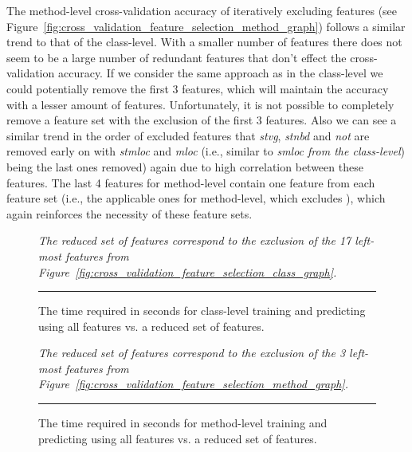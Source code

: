 The method-level cross-validation accuracy of iteratively excluding features (see Figure~\ref{fig:cross_validation_feature_selection_method_graph}) follows a similar trend to that of the class-level. With a smaller number of features there does not seem to be a large number of redundant features that don't effect the cross-validation accuracy. If we consider the same approach as in the class-level we could potentially remove the first 3 features, which will maintain the accuracy with a lesser amount of features. Unfortunately, it is not possible to completely remove a feature set with the exclusion of the first 3 features. Also we can see a similar trend in the order of excluded features that \emph{stvg}, \emph{stnbd} and \emph{not} are removed early on with \emph{stmloc} and \emph{mloc} (i.e., similar to \emph{smloc from the class-level}) being the last ones removed) again due to high correlation between these features. The last 4 features for method-level contain one feature from each feature set (i.e., the applicable ones for method-level, which excludes ), which again reinforces the necessity of these feature sets.

\begin{figure}[ht!]
  \centering
  \begin{adjustbox}{max size={.95\textwidth}{.95\textheight}}
    
  \end{adjustbox}
  \caption{The time required in seconds for class-level training and predicting using all features vs. a reduced set of features.}  \vspace{1mm}
  \footnotesize{\emph{The reduced set of features correspond to the exclusion of the 17 left-most features from Figure~\ref{fig:cross_validation_feature_selection_class_graph}.}}
  \vspace{2mm}
  \hrule
  \label{fig:class_train_prediction_default_time_graph}
\end{figure}

\begin{figure}[ht!]
  \centering
  \begin{adjustbox}{max size={.95\textwidth}{.95\textheight}}
    
  \end{adjustbox}
  \caption{The time required in seconds for method-level training and predicting using all features vs. a reduced set of features.}
  \vspace{1mm}
  \footnotesize{\emph{The reduced set of features correspond to the exclusion of the 3 left-most features from Figure~\ref{fig:cross_validation_feature_selection_method_graph}.}}
  \vspace{2mm}
  \hrule
  \label{fig:method_train_prediction_default_time_graph}
\end{figure}

